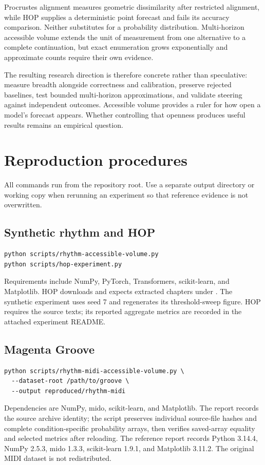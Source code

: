 \documentclass[11pt,a4paper]{article}
\begin{document}
Procrustes alignment measures geometric dissimilarity after restricted alignment, while HOP supplies a deterministic point forecast and fails its accuracy comparison. Neither substitutes for a probability distribution. Multi-horizon accessible volume extends the unit of measurement from one alternative to a complete continuation, but exact enumeration grows exponentially and approximate counts require their own evidence.

The resulting research direction is therefore concrete rather than speculative: measure breadth alongside correctness and calibration, preserve rejected baselines, test bounded multi-horizon approximations, and validate steering against independent outcomes. Accessible volume provides a ruler for how open a model's forecast appears. Whether controlling that openness produces useful results remains an empirical question.

\appendix
\section{Reproduction procedures}
All commands run from the repository root. Use a separate output directory or working copy when rerunning an experiment so that reference evidence is not overwritten.

\subsection{Synthetic rhythm and HOP}
\begin{lstlisting}
python scripts/rhythm-accessible-volume.py
python scripts/hop-experiment.py
\end{lstlisting}
Requirements include NumPy, PyTorch, Transformers, scikit-learn, and Matplotlib. HOP downloads  and expects extracted chapters under . The synthetic experiment uses seed 7 and regenerates its threshold-sweep figure. HOP requires the source texts; its reported aggregate metrics are recorded in the attached experiment README.

\subsection{Magenta Groove}
\begin{lstlisting}
python scripts/rhythm-midi-accessible-volume.py \
  --dataset-root /path/to/groove \
  --output reproduced/rhythm-midi
\end{lstlisting}
Dependencies are NumPy, mido, scikit-learn, and Matplotlib. The report records the source archive identity; the script preserves individual source-file hashes and complete condition-specific probability arrays, then verifies saved-array equality and selected metrics after reloading. The reference report records Python 3.14.4, NumPy 2.5.3, mido 1.3.3, scikit-learn 1.9.1, and Matplotlib 3.11.2. The original MIDI dataset is not redistributed.
\end{document}
